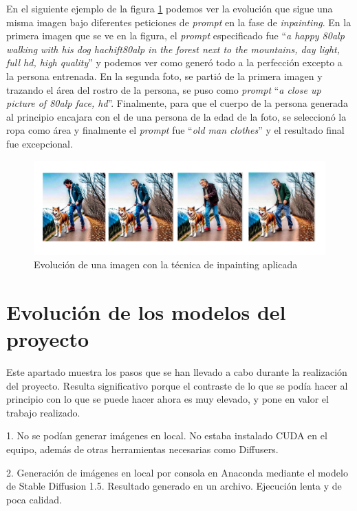 \begin{itemize}
En el siguiente ejemplo de la figura \ref{fig:fasesinpainting} podemos ver la evolución que sigue una misma imagen bajo diferentes peticiones de \textit{prompt} en la fase de \textit{inpainting}. En la primera imagen que se ve en la figura, el \textit{prompt} especificado fue ``\textit{a happy 80alp walking with his dog hachift80alp in the forest next to the mountains, day light, full hd, high quality}'' y podemos ver como generó todo a la perfección excepto a la persona entrenada. En la segunda foto, se partió de la primera imagen y trazando el área del rostro de la persona, se puso como \textit{prompt} ``\textit{a close up picture of 80alp face, hd}''. Finalmente, para que el cuerpo de la persona generada al principio encajara con el de una persona de la edad de la foto, se seleccionó la ropa como área y finalmente el \textit{prompt} fue ``\textit{old man clothes}'' y el resultado final fue excepcional. 

\begin{figure}[h]
	\centering
	\includegraphics[width = 1.1
	\textwidth]{Imagenes/Vectorial/fasesinpainting.png}
	\caption{Evolución de una imagen con la técnica de inpainting aplicada}
	\label{fig:fasesinpainting}
\end{figure}

\section{Evolución de los modelos del proyecto}

Este apartado muestra los pasos que se han llevado a cabo durante la realización del proyecto. Resulta significativo porque el contraste de lo que se podía hacer al principio con lo que se puede hacer ahora es muy elevado, y pone en valor el trabajo realizado.

1. No se podían generar imágenes en local. No estaba instalado CUDA en el equipo, además de otras herramientas necesarias como Diffusers.

2. Generación de imágenes en local por consola en Anaconda mediante el modelo de Stable Diffusion 1.5. Resultado generado en un archivo. Ejecución lenta y de poca calidad.


\end{itemize}
